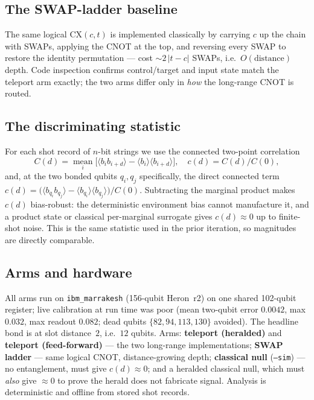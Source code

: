 \documentclass[conference]{IEEEtran}
\begin{document}
\subsection{The SWAP-ladder baseline}

The same logical $\mathrm{CX}(c,t)$ is implemented classically by carrying $c$ up the chain
with SWAPs, applying the CNOT at the top, and reversing every SWAP to restore the identity
permutation --- cost ${\sim}2\,|t-c|$ SWAPs, i.e.\ $O(\text{distance})$ depth. Code
inspection confirms control/target and input state match the teleport arm exactly; the two
arms differ only in \emph{how} the long-range CNOT is routed.

\subsection{The discriminating statistic}

For each shot record of $n$-bit strings we use the connected two-point correlation
\begin{equation}
C(d) = \operatorname*{mean}_{i}\bigl[\langle b_i b_{i+d}\rangle - \langle
b_i\rangle\langle b_{i+d}\rangle\bigr],\quad c(d)=C(d)/C(0),
\end{equation}
and, at the two bonded qubits $q_i,q_j$ specifically, the direct connected term
$c(d){=}\bigl(\langle b_{q_i} b_{q_j}\rangle-\langle b_{q_i}\rangle\langle
b_{q_j}\rangle\bigr)/C(0)$. Subtracting the marginal product makes $c(d)$ bias-robust: the
deterministic environment bias cannot manufacture it, and a product state or classical
per-marginal surrogate gives $c(d){\approx}0$ up to finite-shot noise. This is the same
statistic used in the prior iteration, so magnitudes are directly comparable.

\subsection{Arms and hardware}

All arms run on \texttt{ibm\_marrakesh} (156-qubit Heron~r2) on one shared 102-qubit
register; live calibration at run time was poor (mean two-qubit error $0.0042$, max
$0.032$, max readout $0.082$; dead qubits $\{82,94,113,130\}$ avoided). The headline bond
is at slot distance~$2$, i.e.\ $12$ qubits. Arms: \textbf{teleport (heralded)} and
\textbf{teleport (feed-forward)} --- the two long-range implementations; \textbf{SWAP
ladder} --- same logical CNOT, distance-growing depth; \textbf{classical null}
(\texttt{--sim}) --- no entanglement, must give $c(d){\approx}0$; and a heralded classical
null, which must \emph{also} give $\approx0$ to prove the herald does not fabricate signal.
Analysis is deterministic and offline from stored shot records.
\end{document}
